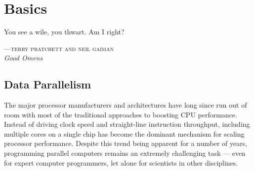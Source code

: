 %
%
%
%

\chapter{Basics}  %
\epigraph{You see a wile, you thwart. Am I right?}%
{\textsc{---terry pratchett and neil gaiman}\\\textit{Good Omens}}


\section{Data Parallelism}
\label{sec:data_parallelism}

The major processor manufacturers and architectures have long since run out of
room with most of the traditional approaches to boosting CPU performance.
Instead of driving clock speed and straight-line instruction throughput,
including multiple cores on a single chip has become the dominant mechanism for
scaling processor performance. Despite this trend being apparent for a number of
years, programming parallel computers remains an extremely challenging task ---
even for expert computer programmers, let alone for scientists in other
disciplines.

